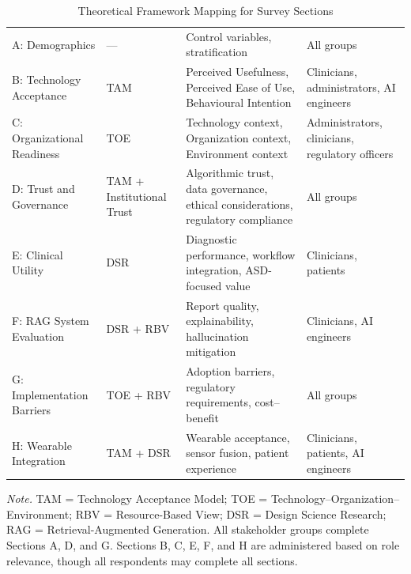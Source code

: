 {\tablestripes\tablefontsize
{}
\begin{xltabular}{\textwidth}{@{} L L L L @{}}
\caption[Theoretical Framework Mapping for Survey Sections]{Theoretical Framework Mapping for Survey Sections}\label{tab:survey_theory_map} \\
\toprule
{} &  &  &  \\
\midrule
\endfirsthead
\endhead
\bottomrule
\endlastfoot
A: Demographics & --- & Control variables, stratification & All groups \\
\addlinespace
B: Technology Acceptance & TAM \cite{davis1989tam} & Perceived Usefulness, Perceived Ease of Use, Behavioural Intention & Clinicians, administrators, AI engineers \\
\addlinespace
C: Organizational Readiness & TOE \cite{tornatzky1990processes} & Technology context, Organization context, Environment context & Administrators, clinicians, regulatory officers \\
\addlinespace
D: Trust and Governance & TAM + Institutional Trust & Algorithmic trust, data governance, ethical considerations, regulatory compliance & All groups \\
\addlinespace
E: Clinical Utility & DSR \cite{hevner2004design} & Diagnostic performance, workflow integration, ASD-focused value & Clinicians, patients \\
\addlinespace
F: RAG System Evaluation & DSR + RBV \cite{barney1991firm} & Report quality, explainability, hallucination mitigation & Clinicians, AI engineers \\
\addlinespace
G: Implementation Barriers & TOE + RBV & Adoption barriers, regulatory requirements, cost--benefit & All groups \\
\addlinespace
H: Wearable Integration & TAM + DSR & Wearable acceptance, sensor fusion, patient experience & Clinicians, patients, AI engineers \\
\end{xltabular}}
\vspace{0.5em}\noindent\textit{Note.} TAM = Technology Acceptance Model; TOE = Technology--Organization--Environment; RBV = Resource-Based View; DSR = Design Science Research; RAG = Retrieval-Augmented Generation. All stakeholder groups complete Sections A, D, and G. Sections B, C, E, F, and H are administered based on role relevance, though all respondents may complete all sections.

